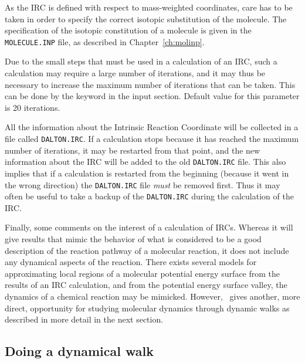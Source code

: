 As the IRC is defined with respect to mass-weighted
coordinates, care
has to be taken in order to specify the correct isotopic substitution
of the molecule. The specification of the isotopic constitution of a
molecule is given in the \verb|MOLECULE.INP| file, as described in
Chapter~\ref{ch:molinp}. 

Due to the small steps that must be used in a calculation of an IRC,
such a calculation may require a large number of
iterations, and it
may thus be necessary to increase the maximum number of iterations
that can be taken.  This can be done by
the keyword  in the  input
section. Default value for this parameter is 20 iterations.

All the information about the Intrinsic Reaction Coordinate will be
collected in a file called \texttt{DALTON.IRC}. If a
calculation stops
because it has reached the maximum number of iterations, it may be
restarted from that point, and the new information about the IRC will
be added to the old \texttt{DALTON.IRC} file. This also implies that if a
calculation is restarted from the beginning (because it went in the
wrong direction) the \texttt{DALTON.IRC} file {\em must\/} be removed
first. Thus it may often be useful to take a backup of the
\texttt{DALTON.IRC} during the calculation of the IRC.

Finally, some comments on the interest of a calculation of IRCs.
Whereas it will give results that mimic the behavior of what is
considered to be a good description of the reaction
pathway of a
molecular reaction, it does not include any dynamical aspects of the
reaction. There exists several models for approximating local regions of a
molecular potential energy surface from the results of an IRC
calculation, and from the
potential energy surface valley, the dynamics of a
chemical reaction may be
mimicked. However, \dalton\ gives another, more direct, opportunity
for studying molecular dynamics through dynamic walks as described in
more detail in the next section.

\subsection{Doing a dynamical walk}\label{sec:dynamic}

\begin{center}
\end{center}


